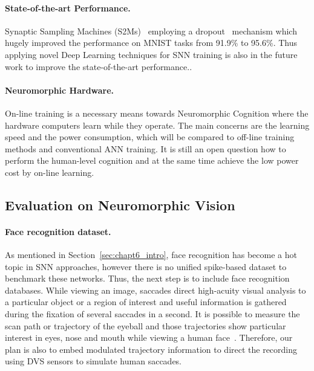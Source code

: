 \paragraph{State-of-the-art Performance.}
Synaptic Sampling Machines (S2Ms)~\citep{neftci2016stochastic} employing a dropout~\citep{srivastava2014dropout} mechanism which hugely improved the performance on MNIST tasks from 91.9\% to 95.6\%.
Thus applying novel Deep Learning techniques for SNN training is also in the future work to improve the state-of-the-art performance..

\paragraph{Neuromorphic Hardware.}
On-line training is a necessary means towards Neuromorphic Cognition where the hardware computers learn while they operate.
The main concerns are the learning speed and the power consumption, which will be compared to off-line training methods and conventional ANN training.
It is still an open question how to perform the human-level cognition and at the same time achieve the low power cost by on-line learning.



\subsection{Evaluation on Neuromorphic Vision}
\DIFaddbegin {}\DIFaddend 

\paragraph{Face recognition dataset.}
As mentioned in Section~\ref{sec:chapt6_intro}, face recognition has become a hot topic in SNN approaches, however there is no unified spike-based dataset to benchmark these networks.
Thus, the next step is to include face recognition databases.
While viewing an image, saccades direct high-acuity visual analysis to a particular object or a region of interest and useful information is gathered during the fixation of several saccades in a second.
It is possible to measure the scan path or trajectory of the eyeball and those trajectories show particular interest in eyes, nose and mouth while viewing a human face~\citep{yarbus1967eye}.
Therefore, our plan is also to embed modulated trajectory information to direct the recording using DVS sensors to simulate human saccades.

